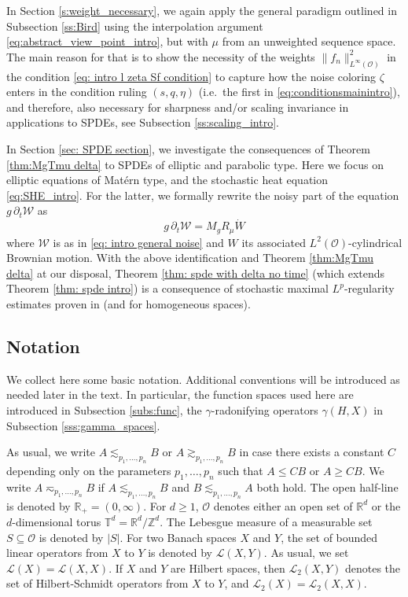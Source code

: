 \documentclass[reqno]{amsart}
\theoremstyle{plain}
\theoremstyle{remark}
\theoremstyle{plain}
\numberwithin{equation}{section}
\newcommand\cL{\mathcal{L}}
\newcommand\calL{\mathcal{L}}
\newcommand\cO{\mathcal{O}}
\newcommand\cW{\mathcal{W}}
\def\Z{{\mathbb Z}}
\def\R{{\mathbb R}}
\newcommand{\g}{\gamma}
\newcommand{\T}{\mathbb{T}}
\newcommand{\1}{\one}
\begin{document}
In Section \ref{s:weight_necessary}, we again apply the general paradigm outlined in Subsection \ref{ss:Bird} using the interpolation argument \eqref{eq:abstract_view_point_intro}, but with $\mu$ from an unweighted sequence space. The main reason for that is to show the necessity of the weights  $\|f_n\|_{L^\infty(\cO)}^2$ in the condition \eqref{eq: intro l zeta Sf condition} to capture how the noise coloring $\zeta$ enters in the condition ruling $(s,q,\eta)$ (i.e.\ the first in \eqref{eq:conditionsmainintro}), and therefore, also necessary for sharpness and/or scaling invariance in applications to SPDEs, see Subsection \ref{ss:scaling_intro}.

\smallskip

In Section \ref{sec: SPDE section}, we investigate the consequences of Theorem \ref{thm:MgTmu delta} to SPDEs of elliptic and parabolic type. 
Here we focus on elliptic equations of Mat\'ern type, and the stochastic heat equation \eqref{eq:SHE_intro}. For the latter, we formally rewrite the noisy part of the equation $g\, \partial_t\cW$ as 
\begin{equation}
\label{eq:identity_cW_to_R_mu_W}
g \, \partial_t \cW = M_g R_\mu \dot{W}
\end{equation}
where $\cW$ is as in \eqref{eq: intro general noise} and $W$ its associated $L^2(\cO)$-cylindrical Brownian motion.
With the above identification and Theorem \ref{thm:MgTmu delta} at our disposal, Theorem \ref{thm: spde with delta no time} (which extends Theorem \ref{thm: spde intro}) is a consequence of stochastic maximal $L^p$-regularity estimates proven in \cite{MaximalLpregularity} (and \cite[Subsection 6.2]{ALV21} for homogeneous spaces).


\subsection*{Notation}
We collect here some basic notation. Additional conventions will be introduced as needed later in the text. In particular, the function spaces used here are introduced in Subsection \ref{subs:func}, the $\g$-radonifying operators $\g(H,X)$ in Subsection \ref{sss:gamma_spaces}.

As usual, we write $A \lesssim_{p_1,\dots,p_n} B$ or $A \gtrsim_{p_1,\dots,p_n} B$ in case there exists a constant $C$ depending only on the parameters $p_1,\dots,p_n$ such that $A\leq C B$ or $A\geq C B$. We write $A \eqsim_{p_1,\dots,p_n} B$ if $A \lesssim_{p_1,\dots,p_n} B$ and $B \lesssim_{p_1,\dots,p_n} A$ both hold.
The open half-line is denoted by $\R_+=(0,\infty)$. 
%
For $d\geq 1$, $\cO$ denotes either an open set of $\R^d$ or the $d$-dimensional torus $\T^d=\R^d/\Z^d$. 
The Lebesgue measure of a measurable set $S\subseteq \cO$ is denoted by $|S|$.
For two Banach spaces $X$ and $Y$, 
the set of bounded linear operators from $X$ to $Y$ is denoted by $\calL(X,Y)$. As usual, we set $\calL(X)=\calL(X,X)$. If $X$ and $Y$ are Hilbert spaces, then $\cL_2(X,Y)$ denotes the set of Hilbert-Schmidt operators from $X$ to $Y$, and $\cL_2(X)=\cL_2(X,X)$.
\end{document}
